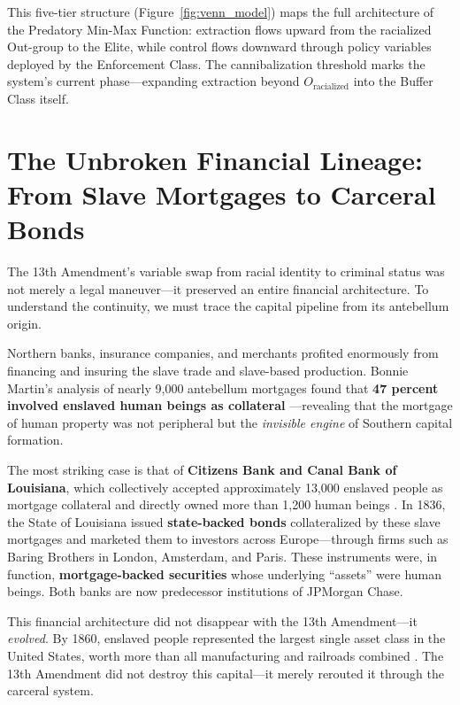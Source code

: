 \documentclass[12pt,openany]{book}
\begin{document}
This five-tier structure (Figure~\ref{fig:venn_model}) maps the full architecture of the Predatory Min-Max Function: extraction flows upward from the racialized Out-group to the Elite, while control flows downward through policy variables deployed by the Enforcement Class. The cannibalization threshold marks the system's current phase---expanding extraction beyond $O_{\text{racialized}}$ into the Buffer Class itself.

\section{The Unbroken Financial Lineage: From Slave Mortgages to Carceral Bonds}

The 13th Amendment's variable swap from racial identity to criminal status was not merely a legal maneuver---it preserved an entire financial architecture. To understand the continuity, we must trace the capital pipeline from its antebellum origin.

Northern banks, insurance companies, and merchants profited enormously from financing and insuring the slave trade and slave-based production. Bonnie Martin's analysis of nearly 9,000 antebellum mortgages found that \textbf{47 percent involved enslaved human beings as collateral} \cite{martin}---revealing that the mortgage of human property was not peripheral but the \textit{invisible engine} of Southern capital formation.

The most striking case is that of \textbf{Citizens Bank and Canal Bank of Louisiana}, which collectively accepted approximately 13,000 enslaved people as mortgage collateral and directly owned more than 1,200 human beings \cite{baptist, murphy}. In 1836, the State of Louisiana issued \textbf{state-backed bonds} collateralized by these slave mortgages and marketed them to investors across Europe---through firms such as Baring Brothers in London, Amsterdam, and Paris. These instruments were, in function, \textbf{mortgage-backed securities} whose underlying ``assets'' were human beings. Both banks are now predecessor institutions of JPMorgan Chase.

This financial architecture did not disappear with the 13th Amendment---it \textit{evolved}. By 1860, enslaved people represented the largest single asset class in the United States, worth more than all manufacturing and railroads combined \cite{baptist, beckert}. The 13th Amendment did not destroy this capital---it merely rerouted it through the carceral system.
\end{document}
